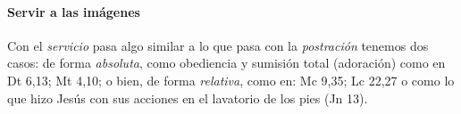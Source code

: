 \documentclass{article}
\begin{document}


\paragraph{Servir a las im\'agenes}

Con el \emph{servicio} pasa algo similar a lo que pasa con la \emph{postraci\'on} tenemos dos casos: de forma \emph{absoluta}, como obediencia y sumisi\'on total (adoraci\'on) como en  Dt 6,13; Mt 4,10; o bien, de forma \emph{relativa}, como en: Mc 9,35; Lc 22,27 o como lo que hizo Jes\'us con sus acciones en el lavatorio de los pies (Jn 13).
\end{document}
